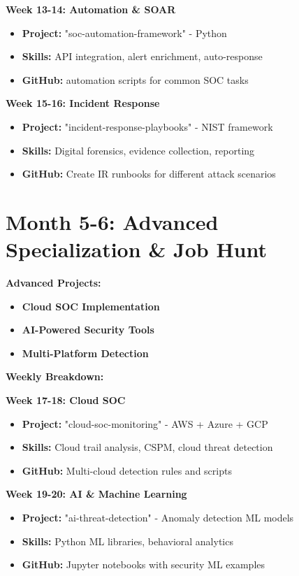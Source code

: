 \documentclass[11pt,a4paper]{article}
\begin{document}
\textbf{Week 13-14: Automation \& SOAR}
\begin{itemize}
    \item \textbf{Project:} "soc-automation-framework" - Python
    \item \textbf{Skills:} API integration, alert enrichment, auto-response
    \item \textbf{GitHub:} automation scripts for common SOC tasks
\end{itemize}

\textbf{Week 15-16: Incident Response}
\begin{itemize}
    \item \textbf{Project:} "incident-response-playbooks" - NIST framework
    \item \textbf{Skills:} Digital forensics, evidence collection, reporting
    \item \textbf{GitHub:} Create IR runbooks for different attack scenarios
\end{itemize}

\section*{Month 5-6: Advanced Specialization \& Job Hunt}

\textbf{\color{cyberblue} Advanced Projects:}
\begin{itemize}
    \item \textbf{Cloud SOC Implementation}
    \item \textbf{AI-Powered Security Tools}
    \item \textbf{Multi-Platform Detection}
\end{itemize}

\textbf{\color{cybergreen} Weekly Breakdown:}

\textbf{Week 17-18: Cloud SOC}
\begin{itemize}
    \item \textbf{Project:} "cloud-soc-monitoring" - AWS + Azure + GCP
    \item \textbf{Skills:} Cloud trail analysis, CSPM, cloud threat detection
    \item \textbf{GitHub:} Multi-cloud detection rules and scripts
\end{itemize}

\textbf{Week 19-20: AI \& Machine Learning}
\begin{itemize}
    \item \textbf{Project:} "ai-threat-detection" - Anomaly detection ML models
    \item \textbf{Skills:} Python ML libraries, behavioral analytics
    \item \textbf{GitHub:} Jupyter notebooks with security ML examples
\end{itemize}
\end{document}
